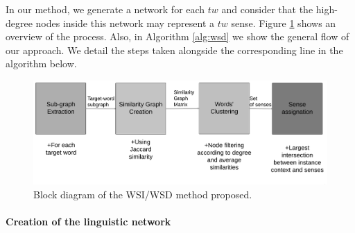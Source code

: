 In our method, we generate a network for each $tw$ and consider that the high-degree nodes inside this network may represent a $tw$ sense. Figure \ref{fig:wsd_wsi_process}  shows an overview of the process. Also, in Algorithm \ref{alg:wsd} we show the general flow of our approach.  We detail the steps taken alongside the corresponding line in the algorithm below. 

\begin{figure}
\centering
\includegraphics[width=1\linewidth]{images/Chapitre4/wsd_wsi_process.png}
\caption{Block diagram of the WSI/WSD method proposed.}
\label{fig:wsd_wsi_process}
\end{figure}


\paragraph{Creation of the linguistic network}


